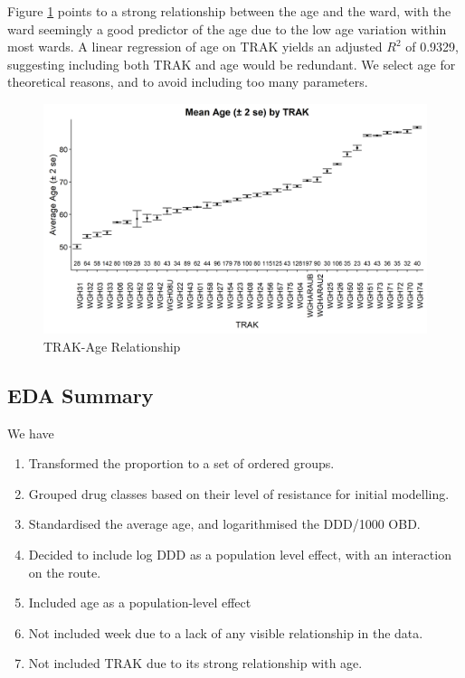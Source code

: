 \documentclass[11pt,twoside]{article}
\numberwithin{Theorem}{section}
\numberwithin{Definition}{section}
\numberwithin{Lemma}{section}
\numberwithin{Algorithm}{section}
\numberwithin{equation}{section}
\begin{document}
Figure \ref{fig::EDA_TRAKAge} points to a strong relationship between the age and the ward, with the ward seemingly a good predictor of the age due to the low age variation within most wards. A linear regression of age on TRAK yields an adjusted $R^2$ of 0.9329, suggesting including both TRAK and age would be redundant. We select age for theoretical reasons, and to avoid including too many parameters.

\begin{figure}[h!]
	\centering
	\includegraphics[height = 0.35\textheight]{Figures/2_3_1_EDA_TRAKAge.png}
	\caption{TRAK-Age Relationship} \label{fig::EDA_TRAKAge}	
\end{figure}

\clearpage


\subsection{EDA Summary}

We have

\begin{enumerate}
	\item Transformed the proportion to a set of ordered groups. 
	\item Grouped drug classes based on their level of resistance for initial modelling.  
	\item Standardised the average age, and logarithmised the DDD/1000 OBD. 
	\item Decided to include log DDD as a population level effect, with an interaction on the route. 
	\item Included age as a population-level effect
	\item Not included week due to a lack of any visible relationship in the data. 
	\item Not included TRAK due to its strong relationship with age. 
\end{enumerate}
\end{document}
